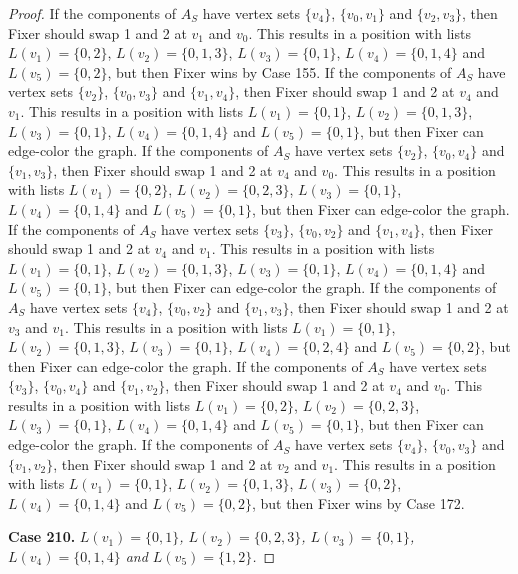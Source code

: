 \documentclass[12pt]{amsart}
\theoremstyle{plain}
\theoremstyle{definition}
\theoremstyle{remark}
\begin{document}
\begin{proof}
If the components of $A_S$ have vertex sets $\{v_4\}$, $\{v_0, v_1\}$ and $\{v_2, v_3\}$, then Fixer should swap 1 and 2 at $v_1$ and $v_0$. This results in a position with lists $L(v_1) = \{0, 2\}$, $L(v_2) = \{0, 1, 3\}$, $L(v_3) = \{0, 1\}$, $L(v_4) = \{0, 1, 4\}$ and $L(v_5) = \{0, 2\}$, but then Fixer wins by Case 155.
If the components of $A_S$ have vertex sets $\{v_2\}$, $\{v_0, v_3\}$ and $\{v_1, v_4\}$, then Fixer should swap 1 and 2 at $v_4$ and $v_1$. This results in a position with lists $L(v_1) = \{0, 1\}$, $L(v_2) = \{0, 1, 3\}$, $L(v_3) = \{0, 1\}$, $L(v_4) = \{0, 1, 4\}$ and $L(v_5) = \{0, 1\}$, but then Fixer can edge-color the graph.
If the components of $A_S$ have vertex sets $\{v_2\}$, $\{v_0, v_4\}$ and $\{v_1, v_3\}$, then Fixer should swap 1 and 2 at $v_4$ and $v_0$. This results in a position with lists $L(v_1) = \{0, 2\}$, $L(v_2) = \{0, 2, 3\}$, $L(v_3) = \{0, 1\}$, $L(v_4) = \{0, 1, 4\}$ and $L(v_5) = \{0, 1\}$, but then Fixer can edge-color the graph.
If the components of $A_S$ have vertex sets $\{v_3\}$, $\{v_0, v_2\}$ and $\{v_1, v_4\}$, then Fixer should swap 1 and 2 at $v_4$ and $v_1$. This results in a position with lists $L(v_1) = \{0, 1\}$, $L(v_2) = \{0, 1, 3\}$, $L(v_3) = \{0, 1\}$, $L(v_4) = \{0, 1, 4\}$ and $L(v_5) = \{0, 1\}$, but then Fixer can edge-color the graph.
If the components of $A_S$ have vertex sets $\{v_4\}$, $\{v_0, v_2\}$ and $\{v_1, v_3\}$, then Fixer should swap 1 and 2 at $v_3$ and $v_1$. This results in a position with lists $L(v_1) = \{0, 1\}$, $L(v_2) = \{0, 1, 3\}$, $L(v_3) = \{0, 1\}$, $L(v_4) = \{0, 2, 4\}$ and $L(v_5) = \{0, 2\}$, but then Fixer can edge-color the graph.
If the components of $A_S$ have vertex sets $\{v_3\}$, $\{v_0, v_4\}$ and $\{v_1, v_2\}$, then Fixer should swap 1 and 2 at $v_4$ and $v_0$. This results in a position with lists $L(v_1) = \{0, 2\}$, $L(v_2) = \{0, 2, 3\}$, $L(v_3) = \{0, 1\}$, $L(v_4) = \{0, 1, 4\}$ and $L(v_5) = \{0, 1\}$, but then Fixer can edge-color the graph.
If the components of $A_S$ have vertex sets $\{v_4\}$, $\{v_0, v_3\}$ and $\{v_1, v_2\}$, then Fixer should swap 1 and 2 at $v_2$ and $v_1$. This results in a position with lists $L(v_1) = \{0, 1\}$, $L(v_2) = \{0, 1, 3\}$, $L(v_3) = \{0, 2\}$, $L(v_4) = \{0, 1, 4\}$ and $L(v_5) = \{0, 2\}$, but then Fixer wins by Case 172.

\noindent\textbf{Case 210.  }\textit{$L(v_1) = \{0, 1\}$, $L(v_2) = \{0, 2, 3\}$, $L(v_3) = \{0, 1\}$, $L(v_4) = \{0, 1, 4\}$ and $L(v_5) = \{1, 2\}$.}


\end{proof}
\end{document}

